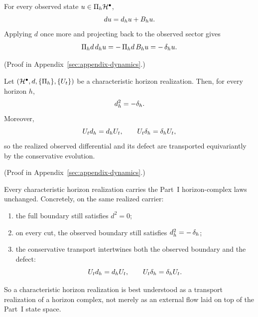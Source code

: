 \begin{lemma}
\label{lem:through-horizon-decomposition}
For every observed state $u \in \CCPi{h}\cH^\bullet$,
\[
du = \CCObs{d}{h}u + \CCLeak{d}{h}u.
\]
Applying $d$ once more and projecting back to the observed sector gives
\[
\CCPi{h}d\,\CCObs{d}{h}u = -\,\CCPi{h}d\,\CCLeak{d}{h}u = -\,\CCDefect{d}{h}u.
\]
\end{lemma}

(Proof in Appendix~\ref{sec:appendix-dynamics}.)

\begin{theorem}
\label{thm:characteristic-realization}
Let $(\cH^\bullet,d,\{\CCPi{h}\},\{U_t\})$ be a characteristic horizon
realization. Then, for every horizon $h$,
\[
\CCObs{d}{h}^2 = - \CCDefect{d}{h}.
\]
Moreover,
\[
U_t \CCObs{d}{h} = \CCObs{d}{h} U_t,
\qquad
U_t \CCDefect{d}{h} = \CCDefect{d}{h} U_t,
\]
so the realized observed differential and its defect are transported
equivariantly by the conservative evolution.
\end{theorem}

(Proof in Appendix~\ref{sec:appendix-dynamics}.)

\begin{theorem}
\label{thm:characteristic-horizon-realizations-transport-the-horizon-complex}
Every characteristic horizon realization carries the Part~I horizon-complex
laws unchanged. Concretely, on the same realized carrier:
\begin{enumerate}[label=(\roman*), leftmargin=2em, itemsep=0.2em]
\item the full boundary still satisfies \(d^2=0\);
\item on every cut, the observed boundary still satisfies
      \(\CCObs{d}{h}^2=-\,\CCDefect{d}{h}\);
\item the conservative transport intertwines both the observed boundary and the
      defect:
      \[
      U_t\CCObs{d}{h}=\CCObs{d}{h}U_t,
      \qquad
      U_t\CCDefect{d}{h}=\CCDefect{d}{h}U_t.
      \]
\end{enumerate}
So a characteristic horizon realization is best understood as a transport
realization of a horizon complex, not merely as an external flow laid on top of
the Part~I state space.
\end{theorem}

